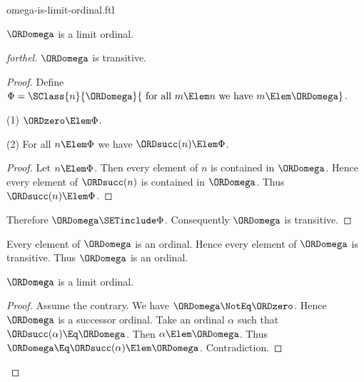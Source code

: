 \documentclass{stex}
\begin{document}
\begin{smodule}{omega-is-limit-ordinal.ftl}

\begin{proposition}[forthel]
  $\ORDomega$ is a limit ordinal.
\end{proposition}
\begin{proof}[forthel]
  $\ORDomega$ is transitive.
  \begin{proof}
    Define $\Phi = \SClass{n}{\ORDomega}{\text{ for all }m \Elem n\text{ we have }m \Elem \ORDomega}$.

    (1) $\ORDzero \Elem \Phi$.

    (2) For all $n \Elem \Phi$ we have $\ORDsucc(n) \Elem \Phi$.
    \begin{proof}
      Let $n \Elem \Phi$.
      Then every element of $n$ is contained in $\ORDomega$.
      Hence every element of $\ORDsucc(n)$ is contained in $\ORDomega$.
      Thus $\ORDsucc(n) \Elem \Phi$.
    \end{proof}

    Therefore $\ORDomega \SETinclude \Phi$.
    Consequently $\ORDomega$ is transitive.
  \end{proof}

  Every element of $\ORDomega$ is an ordinal.
  Hence every element of $\ORDomega$ is transitive.
  Thus $\ORDomega$ is an ordinal.

  $\ORDomega$ is a limit ordinal.
  \begin{proof}
    Assume the contrary.
    We have $\ORDomega \NotEq \ORDzero$.
    Hence $\ORDomega$ is a successor ordinal.
    Take an ordinal $\alpha$ such that $\ORDsucc(\alpha) \Eq \ORDomega$.
    Then $\alpha \Elem \ORDomega$.
    Thus $\ORDomega \Eq \ORDsucc(\alpha) \Elem \ORDomega$.
    Contradiction.
  \end{proof}
\end{proof}
\end{smodule}
\end{document}
